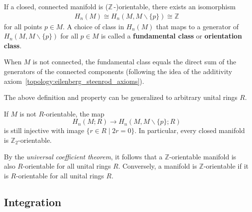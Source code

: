 
    \begin{property}[Orientability]\label{bundle:orientation_class}
        If a closed, connected manifold is ($\mathbb{Z}\,$-)orientable, there exists an isomorphism
        \begin{gather}
            H_n(M)\cong H_n(M,M\backslash\{p\})\cong\mathbb{Z}
        \end{gather}
        for all points $p\in M$. A choice of class in $H_n(M)$ that maps to a generator of $H_n(M,M\backslash\{p\})$ for all $p\in M$ is called a \textbf{fundamental class} or \textbf{orientation class}.

        When $M$ is not connected, the fundamental class equals the direct sum of the generators of the connected components (following the idea of the additivity axiom~\ref{topology:eilenberg_steenrod_axioms}).
    \end{property}
    The above definition and property can be generalized to arbitrary unital rings $R$.

    \begin{property}
        If $M$ is not $R$-orientable, the map \[H_n(M;R)\rightarrow H_n(M,M\backslash\{p\};R)\] is still injective with image $\{r\in R\mid 2r=0\}$. In particular, every closed manifold is $\mathbb{Z}_2$-orientable.
    \end{property}

    \begin{property}
        By the \textit{universal coefficient theorem}, it follows that a $\mathbb{Z}$-orientable manifold is also $R$-orientable for all unital rings $R$. Conversely, a manifold is $\mathbb{Z}$-orientable if it is $R$-orientable for all unital rings $R$.
    \end{property}

\subsection{Integration}

